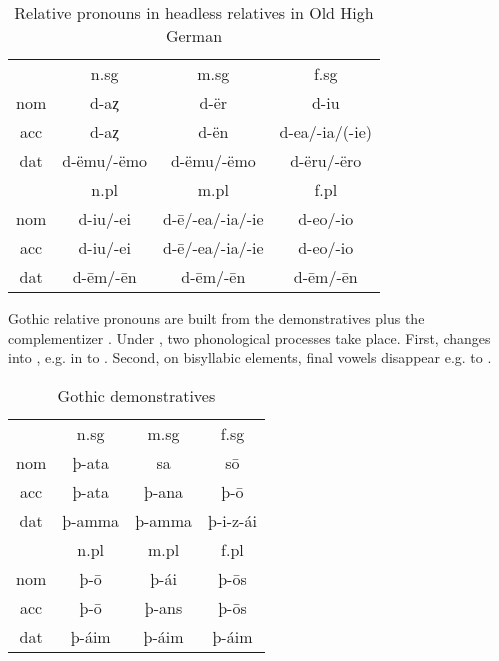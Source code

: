 \begin{table}[H]\label{tbl:paradigmohg}
 \center
 \caption {Relative pronouns in headless relatives in Old High German}
  \begin{tabular}{cccc}
  \toprule
       & \ac{n}.\ac{sg} & \ac{m}.\ac{sg}  & \ac{f}.\ac{sg} \\
        \cmidrule{2-4}
  \ac{nom} & d-aȥ           & d-ër          & d-iu      \\
  \ac{acc} & d-aȥ        & d-ën      & d-ea/-ia/(-ie) \\
  \ac{dat} & d-ëmu/-ëmo     & d-ëmu/-ëmo   & d-ëru/-ëro   \\
  \bottomrule
         & \ac{n}.\ac{pl} & \ac{m}.\ac{pl}   & \ac{f}.\ac{pl} \\
          \cmidrule{2-4}
    \ac{nom}  & d-iu/-ei      &  d-ē/-ea/-ia/-ie & d-eo/-io        \\
    \ac{acc}  & d-iu/-ei      &  d-ē/-ea/-ia/-ie & d-eo/-io        \\
    \ac{dat}  & d-ēm/-ēn      &  d-ēm/-ēn        & d-ēm/-ēn        \\
    \bottomrule
  \end{tabular}
\end{table}

Gothic relative pronouns are built from the demonstratives plus the complementizer . Under , two phonological processes take place. First,  changes into , e.g. in  to . Second, on bisyllabic elements, final vowels disappear e.g.  to .

\begin{table}[H]
	\center
	\caption {Gothic demonstratives}
		\begin{tabular}{cccc}
		\toprule
							& \ac{n}.\ac{sg} 	& \ac{m}.\ac{sg}	& \ac{f}.\ac{sg}  \\
		 						\cmidrule{2-4}
    \ac{nom} 	& þ-ata 	 			  & sa  			  		& sō		    			\\
    \ac{acc}	& þ-ata    	   		& þ-ana  	  	 		& þ-ō     				\\
    \ac{dat} 	& þ-amma 		   		& þ-amma  				& þ-i-z-ái  			\\
		\bottomrule
    					& \ac{n}.\ac{pl}	& \ac{m}.\ac{pl}	& \ac{f}.\ac{pl}	\\
						    \cmidrule{2-4}
    \ac{nom} 	& þ-ō		     			&	þ-ái   					&	þ-ōs	  				\\
    \ac{acc} 	& þ-ō    					&	þ-ans   				&	þ-ōs	   				\\
    \ac{dat} 	& þ-áim   				&	þ-áim    				&	þ-áim   				\\
    \bottomrule
		\end{tabular}
\end{table}

